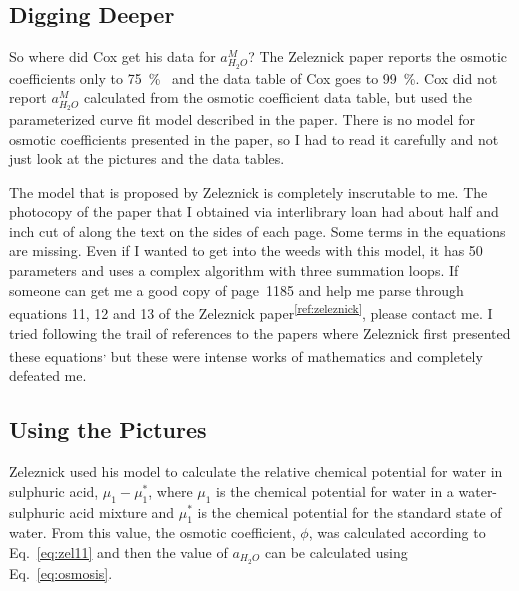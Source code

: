 \documentclass[]{tufte-handout}
\newcommand{\tss}[1]{\textsuperscript{#1}}
\begin{document}
\subsection{Digging Deeper}
So where did Cox get his data for $a_{H_2O}^M$? The Zeleznick paper reports the osmotic coefficients only to \qty{75}{\percent{}} and the data table of Cox goes to \qty{99}{\percent}. Cox did not report $a_{H_2O}^M$ calculated from the osmotic coefficient data table, but used the parameterized curve fit model described in the paper. There is no model for osmotic coefficients presented in the paper, so I had to read it carefully and not just look at the pictures and the data tables.

The model that is proposed by Zeleznick is completely inscrutable to me. The photocopy of the paper that I obtained via interlibrary loan had about half and inch cut of along the text on the sides of each page. Some terms in the equations are  missing. Even if I wanted to get into the weeds with this model, it has 50 parameters and uses a complex algorithm with three summation loops. If someone can get me a good copy of page~1185 and help me parse through equations 11, 12 and 13 of the Zeleznick paper\tss{\ref{ref:zeleznick}}, please contact me. I tried following the trail of references to the papers where Zeleznick first presented these equations\tss{,}
 but these were intense works of mathematics and completely defeated me.
 
\subsection{Using the Pictures} 

Zeleznick used his model to calculate the relative chemical potential for water in sulphuric acid, $\mu_1 - \mu_1^*$, where $\mu_1$ is the chemical potential for water in a water-sulphuric acid mixture and $\mu_1^*$ is the chemical potential for the standard state of water. From this value, the osmotic coefficient, $\phi$, was calculated according to Eq.~\vref{eq:zel11} and then the value of $a_{H_2O}$ can be calculated using Eq.~\vref{eq:osmosis}.
\end{document}
